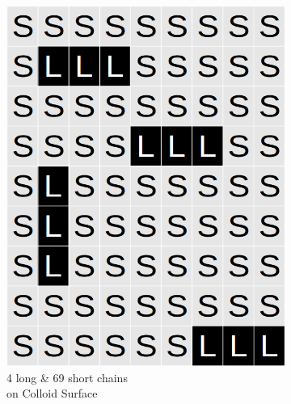\documentclass[journal=mamobx,manuscript=article]{achemso}
\begin{document}
\begin{figure}[H]
\begin{subfigure}[b]{0.4\textwidth}
        \includegraphics[scale=0.15]{fig8e.png}
        \caption{4 long \& 69 short chains\\ on Colloid Surface}
        \label{fig:E}
    \end{subfigure}
    \begin{subfigure}[b]{0.4\textwidth}

\end{subfigure}
\end{figure}
\end{document}
